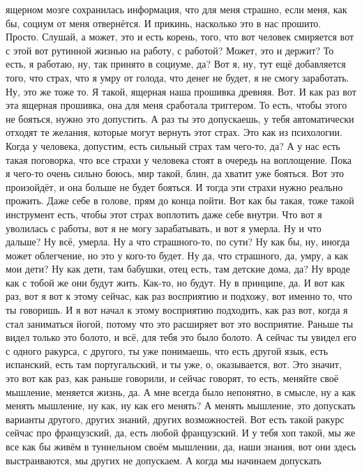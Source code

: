 ящерном мозге сохранилась информация,
что для меня страшно, если меня, как бы,
социум от меня отвернётся.
И прикинь, насколько это в нас прошито.
Просто.
Слушай, а может, это и есть корень,
того, что вот человек смиряется
вот с этой вот рутинной жизнью на работу,
с работой?
Может, это и держит? То есть, я работаю,
ну, так принято в социуме, да?
Вот я, ну, тут ещё добавляется того,
что страх, что я умру от голода,
что денег не будет, я не смогу заработать.
Ну, это же тоже то.
Я такой, ящерная наша прошивка
древняя. Вот. И как раз вот эта
ящерная прошивка, она
для меня сработала триггером. То есть,
чтобы этого не бояться,
нужно это допустить.
А раз ты это допускаешь, у тебя
автоматически отходят те
желания, которые могут
вернуть этот страх. Это как из психологии.
Когда у человека, допустим,
есть сильный страх там чего-то,
да? А у нас есть такая поговорка,
что все страхи у человека стоят в очередь
на воплощение. Пока я чего-то
очень сильно боюсь, мир такой,
блин, да хватит уже бояться. Вот это произойдёт,
и она больше не будет бояться.
И тогда эти страхи нужно реально прожить.
Даже себе в голове, прям до конца
пойти. Вот как бы такая,
тоже такой инструмент есть, чтобы этот страх
воплотить даже себе внутри. Что
вот я уволилась с работы, вот я
не могу зарабатывать,
и вот я умерла. Ну и что дальше?
Ну всё, умерла. Ну а что страшного-то, по сути?
Ну как бы,
ну, иногда
может облегчение, но это у кого-то
будет. Ну да, что
страшного, да, умру, а как мои дети?
Ну как дети, там бабушки,
отец есть, там детские дома, да? Ну вроде как
с тобой же они будут жить. Как-то, но
будут. Ну в принципе, да. И вот как раз,
вот я вот к этому сейчас, как раз
восприятию и подхожу, вот именно то, что
ты говоришь. И я вот начал к этому
восприятию подходить, как раз вот, когда я стал
заниматься йогой, потому что
это расширяет вот это восприятие.
Раньше ты видел только это болото, и всё,
для тебя это было болото. А сейчас ты увидел
его с одного ракурса, с другого,
ты уже понимаешь, что есть другой язык,
есть испанский, есть там
португальский, и ты уже, о,
оказывается, вот. Это значит, это вот как раз,
как раньше говорили, и сейчас говорят,
то есть, меняйте своё мышление,
меняется жизнь, да. А мне всегда было непонятно,
в смысле, ну а как менять мышление, ну как, ну как его менять?
А менять мышление, это допускать
варианты другого,
других знаний, других возможностей.
Вот есть такой ракурс сейчас про французский,
да, есть любой французский.
И у тебя хоп такой, мы же все как бы живём
в туннельном своём мышлении, да,
наши знания, вот они здесь выстраиваются, мы других
не допускаем. А когда мы начинаем допускать

